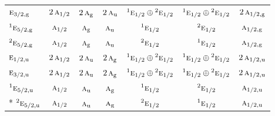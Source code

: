 \documentclass[10pt,a4paper]{article}
\numberwithin{equation}{section}
\newcommand{\irr}[1]{\text{\normalfont\scshape #1}}
\newcommand{\conjpair}[1]{{}^{#1}}
\newcommand{\ptag}[1]{\mathrm{#1}}
\begin{document}
{\begin{longtable}{@{}lcccccc@{}}
$\irr{e}_{3/2,\ptag{g}}$ & $2\,\irr{a}_{1/2}$ & $2\,\irr{a}_{\ptag{g}}$ & $2\,\irr{a}_{\ptag{u}}$ & $\conjpair{1}\irr{e}_{1/2}\oplus \conjpair{2}\irr{e}_{1/2}$ & $\conjpair{1}\irr{e}_{1/2}\oplus \conjpair{2}\irr{e}_{1/2}$ & $2\,\irr{a}_{1/2,\ptag{g}}$\\
$\conjpair{1}\irr{e}_{5/2,\ptag{g}}$ & $\irr{a}_{1/2}$ & $\irr{a}_{\ptag{g}}$ & $\irr{a}_{\ptag{u}}$ & $\conjpair{1}\irr{e}_{1/2}$ & $\conjpair{2}\irr{e}_{1/2}$ & $\irr{a}_{1/2,\ptag{g}}$\\
$\conjpair{2}\irr{e}_{5/2,\ptag{g}}$ & $\irr{a}_{1/2}$ & $\irr{a}_{\ptag{g}}$ & $\irr{a}_{\ptag{u}}$ & $\conjpair{2}\irr{e}_{1/2}$ & $\conjpair{1}\irr{e}_{1/2}$ & $\irr{a}_{1/2,\ptag{g}}$\\
$\irr{e}_{1/2,\ptag{u}}$ & $2\,\irr{a}_{1/2}$ & $2\,\irr{a}_{\ptag{u}}$ & $2\,\irr{a}_{\ptag{g}}$ & $\conjpair{1}\irr{e}_{1/2}\oplus \conjpair{2}\irr{e}_{1/2}$ & $\conjpair{1}\irr{e}_{1/2}\oplus \conjpair{2}\irr{e}_{1/2}$ & $2\,\irr{a}_{1/2,\ptag{u}}$\\
$\irr{e}_{3/2,\ptag{u}}$ & $2\,\irr{a}_{1/2}$ & $2\,\irr{a}_{\ptag{u}}$ & $2\,\irr{a}_{\ptag{g}}$ & $\conjpair{1}\irr{e}_{1/2}\oplus \conjpair{2}\irr{e}_{1/2}$ & $\conjpair{1}\irr{e}_{1/2}\oplus \conjpair{2}\irr{e}_{1/2}$ & $2\,\irr{a}_{1/2,\ptag{u}}$\\
$\conjpair{1}\irr{e}_{5/2,\ptag{u}}$ & $\irr{a}_{1/2}$ & $\irr{a}_{\ptag{u}}$ & $\irr{a}_{\ptag{g}}$ & $\conjpair{1}\irr{e}_{1/2}$ & $\conjpair{2}\irr{e}_{1/2}$ & $\irr{a}_{1/2,\ptag{u}}$\\*
$\conjpair{2}\irr{e}_{5/2,\ptag{u}}$ & $\irr{a}_{1/2}$ & $\irr{a}_{\ptag{u}}$ & $\irr{a}_{\ptag{g}}$ & $\conjpair{2}\irr{e}_{1/2}$ & $\conjpair{1}\irr{e}_{1/2}$ & $\irr{a}_{1/2,\ptag{u}}$\\
\bottomrule\end{longtable}}
\end{document}
